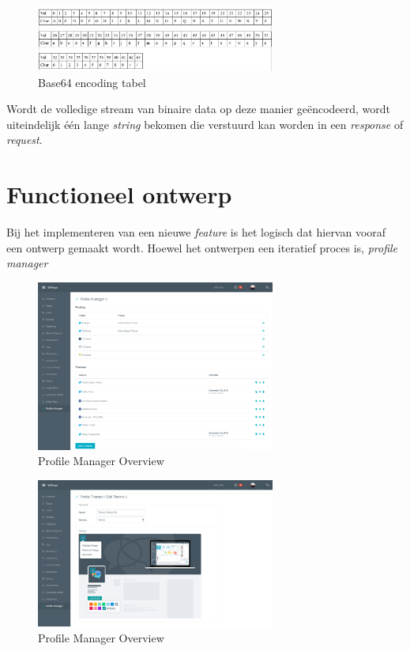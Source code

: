 \begin{figure}[H]
	\centering
	\includegraphics[width=0.7\textwidth]{Figuren/Base64EncodingTable.jpg}
	\caption{Base64 encoding tabel \cite{Base64Image}}
	\label{fig:Base64Table}
\end{figure} 

Wordt de volledige stream van binaire data op deze manier ge\"{e}ncodeerd, wordt uiteindelijk \'{e}\'{e}n lange \textit{string} bekomen die verstuurd kan worden in een \textit{response} of \textit{request}.

\iffalse
\newpage
\section{Functioneel ontwerp}
Bij het implementeren van een nieuwe \textit{feature} is het logisch dat hiervan vooraf een ontwerp gemaakt wordt. Hoewel het ontwerpen een iteratief proces is, 
\textit{profile manager} 


\begin{figure}[H]
	\centering
	\includegraphics[width=0.7\textwidth]{Figuren/Mockups/Overview.png}
	\caption{Profile Manager Overview}
\end{figure} 

\begin{figure}[H]
	\centering
	\includegraphics[width=0.7\textwidth]{Figuren/Mockups/AddTheme.png}
	\caption{Profile Manager Overview}
\end{figure} 

